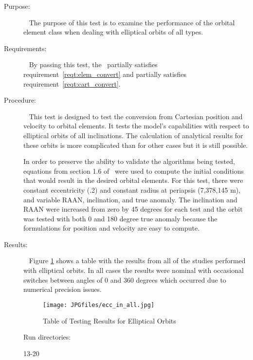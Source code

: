 \label{test:circ_ell_per}
\begin{description}
\item[Purpose:] \ \newline
The purpose of this test is to examine the performance of the orbital element
class when dealing with elliptical orbits of all types.
\item[Requirements:] \ \newline
By passing this test, the \OrbitalElement\ partially satisfies
requirement~\ref{reqt:elem_convert} and partially satisfies
requirement~\ref{reqt:cart_convert}.
\item[Procedure:]\ \newline
This test is designed to test the conversion from Cartesian position and
velocity to orbital elements.  It tests the model's capabilities with respect
to elliptical orbits of all inclinations.  The calculation of analytical
results for these orbits is more complicated than for other cases but it
is still possible.

In order to preserve the ability to validate the algorithms being tested,
equations from section 1.6 of~\cite{BMW} were used to compute the initial
conditions that would result in the desired orbital elements.  For this test,
there were constant eccentricity (.2) and constant radius at periapsis
(7,378,145 m), and variable RAAN, inclination, and true anomaly.  The
inclination and RAAN were increased from zero by 45 degrees for each test
and the orbit was tested with both 0 and 180 degree true anomaly because
the formulations for position and velocity are easy to compute.
\item[Results:]\ \newline
Figure \ref{cir_ecc_all} shows a table with the results from all of the studies
performed with elliptical orbits.  In all cases the results were nominal with
occasional switches between angles of 0 and 360 degrees which occurred due to
numerical precision issues.

\begin{figure}[h]
\begin{center}
\texttt{[image: JPGfiles/ecc\_in\_all.jpg]}
\caption{Table of Testing Results for Elliptical Orbits}
\label{cir_ecc_all}
\end{center}
\end{figure}

Run directories:

13-20

\end{description}

